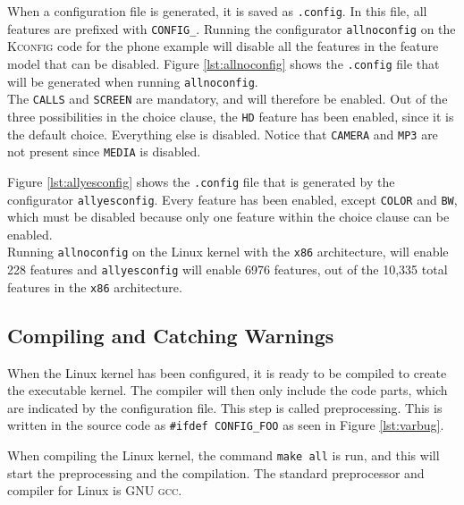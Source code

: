 \documentclass[a4paper,11pt]{report}
\newcommand{\textcode}[1]{\fboxsep=1pt\texttt{\colorbox{gray!20}{#1}}}
\newcommand{\figa}{
    \begin{figure}[!htpb]
    \centering
}
\newcommand{\figb}[2]{
    \caption{#1}
    \label{#2}
    \end{figure}
}
\begin{document}
When a configuration file is generated, it is saved as \texttt{.config}.
In this file, all features are prefixed with \texttt{CONFIG\_}.  
Running the configurator \texttt{allnoconfig} on the \textsc{Kconfig} code for 
the phone example will disable all the features 
in the feature model that can be disabled. Figure \ref{lst:allnoconfig} shows 
the \texttt{.config} file that will be generated when running 
\texttt{allnoconfig}.
\\

The \texttt{CALLS} and \texttt{SCREEN} are mandatory, and will 
therefore be enabled. Out of the three possibilities in the choice clause, the 
\texttt{HD} feature has been enabled, since it is the default choice. Everything
else is disabled. Notice that \texttt{CAMERA} and \texttt{MP3} are not present since \texttt{MEDIA} is disabled.


\figa
    \subfigure[allnoconfig]{
        \label{lst:allnoconfig}
        
    }
    \qquad %
    \subfigure[allyesconfig]{
        \label{lst:allyesconfig}
        
    }
\figb{}{}


Figure \ref{lst:allyesconfig} shows the \texttt{.config} file that is generated by 
the configurator \texttt{allyesconfig}.
Every feature has been enabled, except \texttt{COLOR} and \texttt{BW}, which 
must be disabled because only one feature within the choice clause can be enabled.
\\

Running \texttt{allnoconfig} on the Linux kernel with the \texttt{x86} architecture, will enable 228 features and 
\texttt{allyesconfig} will enable 6976 features, out of the 10,335 total features in the \texttt{x86} architecture.


            \subsection{Compiling and Catching Warnings}

When the Linux kernel has been configured, it is ready to be compiled to create 
the executable kernel. The compiler will then only include the code parts, 
which are indicated by the configuration file. This step is called preprocessing. This is written in the source 
code as \textcode{\#ifdef CONFIG\_FOO} as seen in Figure \ref{lst:varbug}.

When compiling the Linux kernel, the command \textcode{make all} is run, and 
this will start the preprocessing and the compilation. The standard preprocessor and compiler for Linux is \textsc{GNU gcc}. 
\\
\end{document}

